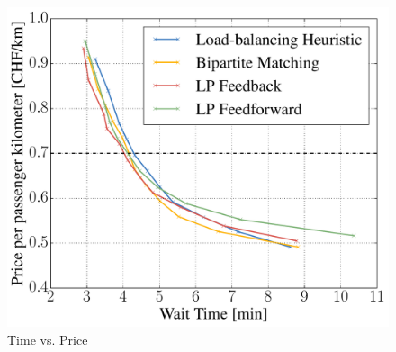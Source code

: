 
\begin{figure}
\includegraphics[width=1.0\textwidth]{figures/time_vs_price.pdf}
\caption{Time vs. Price}
\label{fig:time_vs_price}
\end{figure}
